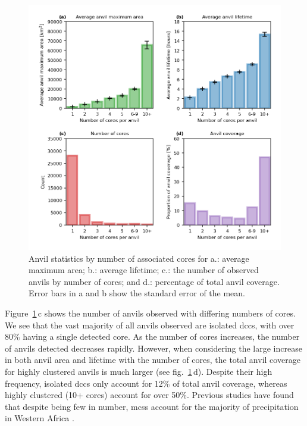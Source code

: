 \begin{figure}[tp]
    \includegraphics[width=\textwidth]{figures/chapter4_09.png}
    \caption[
    Anvil statistics by number of associated cores for average maximum area, average lifetime, occurrence of anvils by number of cores, and percentage of total anvil coverage
    ]{
    Anvil statistics by number of associated cores for a.: average maximum area; b.: average lifetime; c.: the number of observed anvils by number of cores; and d.: percentage of total anvil coverage. Error bars in a and b show the standard error of the mean.
    }
    \label{fig:seviri_anvil_stats}
\end{figure}


Figure~\ref{fig:seviri_anvil_stats}\,c shows the number of anvils observed with differing numbers of cores. 
We see that the vast majority of all anvils observed are isolated \acrshort{dcc}s, with over 80\% having a single detected core. 
As the number of cores increases, the number of anvils detected decreases rapidly. 
However, when considering the large increase in both anvil area and lifetime with the number of cores, the total anvil coverage for highly clustered anvils is much larger (see fig.~\ref{fig:seviri_anvil_stats}\,d). 
Despite their high frequency, isolated \acrshort{dcc}s only account for 12\% of total anvil coverage, whereas highly clustered (10+ cores) account for over 50\%. 
Previous studies have found that despite being few in number, \acrshort{mcs}s account for the majority of precipitation in Western Africa \citep{vizy_understanding_2019}.

